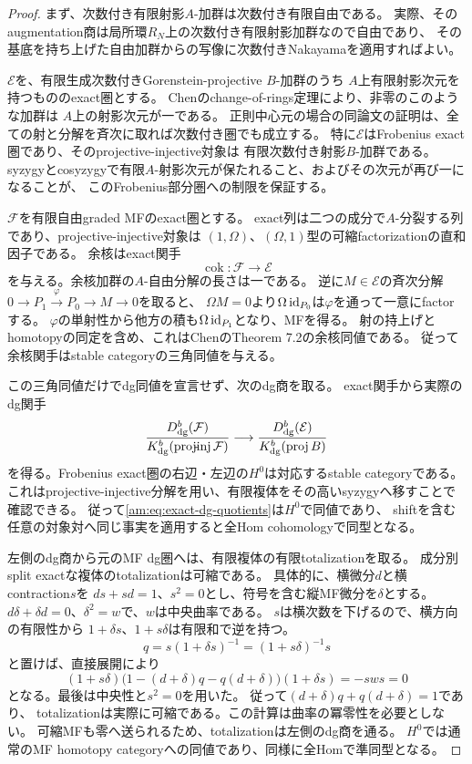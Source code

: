 \begin{proof}
まず、次数付き有限射影$A$-加群は次数付き有限自由である。
実際、そのaugmentation商は局所環$R_N$上の次数付き有限射影加群なので自由であり、
その基底を持ち上げた自由加群からの写像に次数付きNakayamaを適用すればよい。

$\mathcal E$を、有限生成次数付きGorenstein-projective $B$-加群のうち
$A$上有限射影次元を持つもののexact圏とする。
Chenのchange-of-rings定理により、非零のこのような加群は
$A$上の射影次元が一である。
正則中心元の場合の同論文の証明は、全ての射と分解を斉次に取れば次数付き圏でも成立する。
特に$\mathcal E$はFrobenius exact圏であり、そのprojective-injective対象は
有限次数付き射影$B$-加群である。
syzygyとcosyzygyで有限$A$-射影次元が保たれること、およびその次元が再び一になることが、
このFrobenius部分圏への制限を保証する。

$\mathcal F$を有限自由graded MFのexact圏とする。
exact列は二つの成分で$A$-分裂する列であり、projective-injective対象は
$(1,\Omega)$、$(\Omega,1)$型の可縮factorizationの直和因子である。
余核はexact関手
\[
 \operatorname{cok}:\mathcal F\longrightarrow\mathcal E
\]
を与える。余核加群の$A$-自由分解の長さは一である。
逆に$M\in\mathcal E$の斉次分解
$0\to P_1\xrightarrow{\varphi}P_0\to M\to0$を取ると、
$\Omega M=0$より$\Omega\operatorname{id}_{P_0}$は$\varphi$を通って一意にfactorする。
$\varphi$の単射性から他方の積も$\Omega\operatorname{id}_{P_1}$となり、MFを得る。
射の持上げとhomotopyの同定を含め、これはChenのTheorem 7.2の余核同値である。
従って余核関手はstable categoryの三角同値を与える。

この三角同値だけでdg同値を宣言せず、次のdg商を取る。
exact関手から実際のdg関手
\begin{equation}\label{am:eq:exact-dg-quotients}
 \frac{D^b_{\rm dg}(\mathcal F)}{K^b_{\rm dg}(\operatorname{proj\!-\!inj}\mathcal F)}
 \longrightarrow
 \frac{D^b_{\rm dg}(\mathcal E)}{K^b_{\rm dg}(\operatorname{proj}B)}
\end{equation}
を得る。Frobenius exact圏の右辺・左辺の$H^0$は対応するstable categoryである。
これはprojective-injective分解を用い、有限複体をその高いsyzygyへ移すことで確認できる。
従って\eqref{am:eq:exact-dg-quotients}は$H^0$で同値であり、
shiftを含む任意の対象対へ同じ事実を適用すると全Hom cohomologyで同型となる。

左側のdg商から元のMF dg圏へは、有限複体の有限totalizationを取る。
成分別split exactな複体のtotalizationは可縮である。
具体的に、横微分$d$と横contraction$s$を
$ds+sd=1$、$s^2=0$とし、符号を含む縦MF微分を$\delta$とする。
$d\delta+\delta d=0$、$\delta^2=w$で、$w$は中央曲率である。
$s$は横次数を下げるので、横方向の有限性から
$1+\delta s$、$1+s\delta$は有限和で逆を持つ。
\[
 q=s(1+\delta s)^{-1}=(1+s\delta)^{-1}s
\]
と置けば、直接展開により
\[
 (1+s\delta)\bigl(1-(d+\delta)q-q(d+\delta)\bigr)
 (1+\delta s)=-sws=0
\]
となる。最後は中央性と$s^2=0$を用いた。
従って$(d+\delta)q+q(d+\delta)=1$であり、
totalizationは実際に可縮である。この計算は曲率の冪零性を必要としない。
可縮MFも零へ送られるため、totalizationは左側のdg商を通る。
$H^0$では通常のMF homotopy categoryへの同値であり、同様に全Homで準同型となる。


\end{proof}
